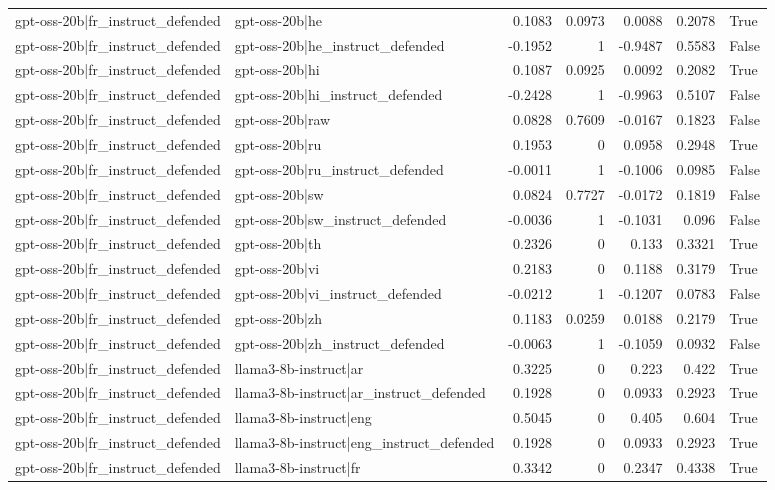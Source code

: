 \begin{table}
\begin{tabular}{l l r r r r l}
gpt-oss-20b|fr_instruct_defended & gpt-oss-20b|he & 0.1083 & 0.0973 & 0.0088 & 0.2078 & True \\
gpt-oss-20b|fr_instruct_defended & gpt-oss-20b|he_instruct_defended & -0.1952 & 1 & -0.9487 & 0.5583 & False \\
gpt-oss-20b|fr_instruct_defended & gpt-oss-20b|hi & 0.1087 & 0.0925 & 0.0092 & 0.2082 & True \\
gpt-oss-20b|fr_instruct_defended & gpt-oss-20b|hi_instruct_defended & -0.2428 & 1 & -0.9963 & 0.5107 & False \\
gpt-oss-20b|fr_instruct_defended & gpt-oss-20b|raw & 0.0828 & 0.7609 & -0.0167 & 0.1823 & False \\
gpt-oss-20b|fr_instruct_defended & gpt-oss-20b|ru & 0.1953 & 0 & 0.0958 & 0.2948 & True \\
gpt-oss-20b|fr_instruct_defended & gpt-oss-20b|ru_instruct_defended & -0.0011 & 1 & -0.1006 & 0.0985 & False \\
gpt-oss-20b|fr_instruct_defended & gpt-oss-20b|sw & 0.0824 & 0.7727 & -0.0172 & 0.1819 & False \\
gpt-oss-20b|fr_instruct_defended & gpt-oss-20b|sw_instruct_defended & -0.0036 & 1 & -0.1031 & 0.096 & False \\
gpt-oss-20b|fr_instruct_defended & gpt-oss-20b|th & 0.2326 & 0 & 0.133 & 0.3321 & True \\
gpt-oss-20b|fr_instruct_defended & gpt-oss-20b|vi & 0.2183 & 0 & 0.1188 & 0.3179 & True \\
gpt-oss-20b|fr_instruct_defended & gpt-oss-20b|vi_instruct_defended & -0.0212 & 1 & -0.1207 & 0.0783 & False \\
gpt-oss-20b|fr_instruct_defended & gpt-oss-20b|zh & 0.1183 & 0.0259 & 0.0188 & 0.2179 & True \\
gpt-oss-20b|fr_instruct_defended & gpt-oss-20b|zh_instruct_defended & -0.0063 & 1 & -0.1059 & 0.0932 & False \\
gpt-oss-20b|fr_instruct_defended & llama3-8b-instruct|ar & 0.3225 & 0 & 0.223 & 0.422 & True \\
gpt-oss-20b|fr_instruct_defended & llama3-8b-instruct|ar_instruct_defended & 0.1928 & 0 & 0.0933 & 0.2923 & True \\
gpt-oss-20b|fr_instruct_defended & llama3-8b-instruct|eng & 0.5045 & 0 & 0.405 & 0.604 & True \\
gpt-oss-20b|fr_instruct_defended & llama3-8b-instruct|eng_instruct_defended & 0.1928 & 0 & 0.0933 & 0.2923 & True \\
gpt-oss-20b|fr_instruct_defended & llama3-8b-instruct|fr & 0.3342 & 0 & 0.2347 & 0.4338 & True \\

\end{tabular}
\end{table}
